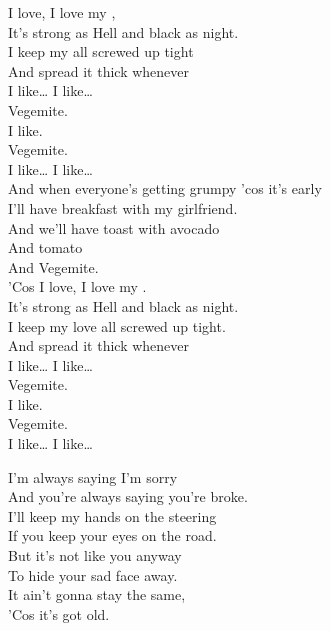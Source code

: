 I love, I love my , \\
It's strong as Hell and black as night. \\
I keep my  all screwed up tight \\
And spread it thick whenever \\
I like… I like… \\

Vegemite. \\
I like. \\
Vegemite. \\
I like… I like… \\

And when everyone's getting grumpy 'cos it's early \\
I'll have breakfast with my girlfriend. \\
And we'll have toast with avocado \\
And tomato \\
And Vegemite. \\

'Cos I love, I love my . \\
It's strong as Hell and black as night. \\
I keep my love all screwed up tight. \\
And spread it thick whenever \\
I like… I like… \\

Vegemite. \\
I like. \\
Vegemite. \\
I like… I like… \\





I'm always saying I'm sorry \\
And you're always saying you're broke. \\
I'll keep my hands on the steering  \\
If you keep your eyes on the road. \\
But it's not like you anyway \\
To hide your sad face away. \\
It ain't gonna stay the same, \\
'Cos it's got old. \\

